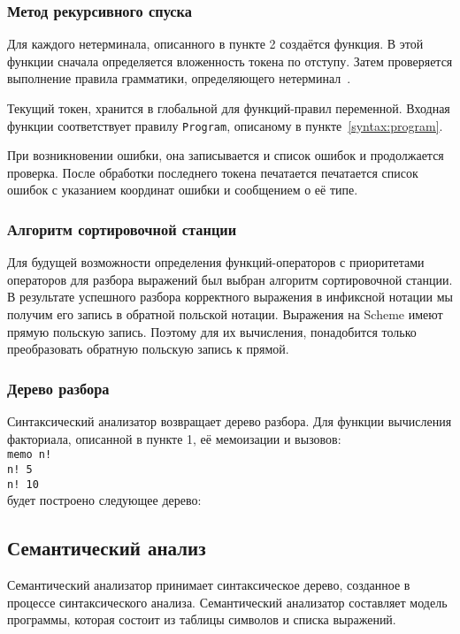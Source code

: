         \subsubsection{Метод рекурсивного спуска}
        Для каждого нетерминала, описанного в пункте 2 создаётся функция.
        В этой функции сначала определяется вложенность токена по отступу.
        Затем проверяется выполнение правила грамматики, определяющего нетерминал~\cite{skor}.

        Текущий токен, хранится в глобальной для функций-правил переменной.
        Входная функции соответствует правилу \verb$Program$, описаному в пункте~\ref{syntax:program}.

        При возникновении ошибки, она записывается и список ошибок и продолжается проверка.
        После обработки последнего токена печатается печатается список ошибок с указанием координат ошибки и сообщением о её типе.

        \subsubsection{Алгоритм сортировочной станции}
        Для будущей возможности определения функций-операторов с приоритетами операторов для разбора выражений был выбран алгоритм сортировочной станции.
        В результате успешного разбора корректного выражения в инфиксной нотации мы получим его запись в обратной польской нотации.
        Выражения на Scheme имеют прямую польскую запись.
        Поэтому для их вычисления, понадобится только преобразовать обратную польскую запись к прямой.

        \subsubsection{Дерево разбора}
        Синтаксический анализатор возвращает дерево разбора.
        Для функции вычисления факториала, описанной в пункте 1, её мемоизации и вызовов:
        \\ \verb,memo n!,
        \\ \verb,n! 5,
        \\ \verb,n! 10,
        \\ будет построено следующее дерево:

        

    \subsection{Семантический анализ}
    \label{comp:model}
    Семантический анализатор принимает синтаксическое дерево, созданное в процессе синтаксического анализа.
    Семантический анализатор составляет модель программы, которая состоит из таблицы символов и списка выражений.

